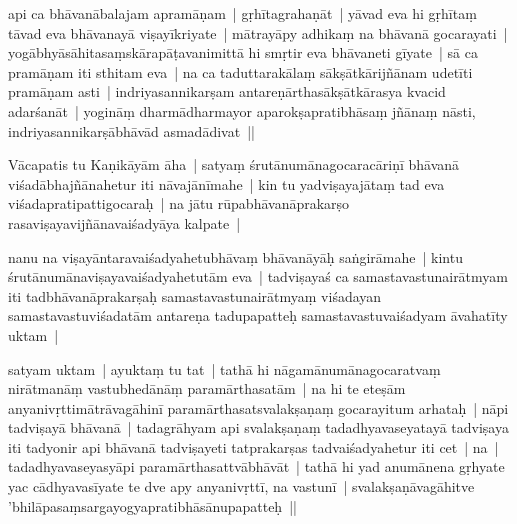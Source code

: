 \documentclass[article,12pt,a4paper]{memoir}%
\newcounter{parCount}
\begin{document}
	  
	  

	  
	  \pstart \leavevmode%
	api ca bhāvanābalajam apramāṇam | gṛhītagrahaṇāt | yāvad eva hi gṛhītaṃ tāvad eva bhāvanayā viṣayīkriyate | mātrayāpy adhikaṃ na bhāvanā gocarayati | yogābhyāsāhitasaṃskārapāṭavanimittā hi smṛtir eva bhāvaneti gīyate | sā ca pramāṇam iti sthitam eva | na ca taduttarakālaṃ sākṣātkārijñānam udetīti pramāṇam asti | indriyasannikarṣam antareṇārthasākṣātkārasya kvacid adarśanāt | yogināṃ dharmādharmayor aparokṣapratibhāsaṃ jñānaṃ nāsti, indriyasannikarṣābhāvād asmadādivat || 
	{}
	\pend%
      

	  
	  \pstart \leavevmode%
	\label{thakur75-10.14}Vācapatis tu Kaṇikāyām āha | satyaṃ śrutānumānagocaracāriṇī bhāvanā viśadābhajñānahetur iti nāvajānīmahe | kin tu yadviṣayajātaṃ tad eva viśadapratipattigocaraḥ | na jātu rūpabhāvanāprakarṣo rasaviṣayavijñānavaiśadyāya kalpate | 
	{}
	\pend%
      

	  
	  \pstart \leavevmode%
	\label{thakur75-10.17}nanu na viṣayāntaravaiśadyahetubhāvaṃ bhāvanāyāḥ saṅgirāmahe | kintu śrutānumānaviṣayavaiśadyahetutām eva | tadviṣayaś ca samastavastunairātmyam iti tadbhāvanāprakarṣaḥ samastavastunairātmyaṃ viśadayan samastavastuviśadatām antareṇa tadupapatteḥ samastavastuvaiśadyam āvahatīty uktam | 
	{}
	\pend%
      

	  
	  \pstart \leavevmode%
	\label{thakur75-10.21}satyam uktam | ayuktaṃ tu tat | tathā hi nāgamānumānagocaratvaṃ nirātmanāṃ vastubhedānāṃ paramārthasatām | na hi te eteṣām anyanivṛttimātrāvagāhinī paramārthasatsvalakṣaṇaṃ gocarayitum arhataḥ | nāpi tadviṣayā bhāvanā | tadagrāhyam api svalakṣaṇaṃ tadadhyavaseyatayā tadviṣaya iti tadyonir api bhāvanā tadviṣayeti tatprakarṣas tadvaiśadyahetur iti cet | na | tadadhyavaseyasyāpi paramārthasattvābhāvāt | tathā hi yad anumānena gṛhyate yac cādhyavasīyate te dve apy anyanivṛttī, na vastunī | svalakṣaṇāvagāhitve 'bhilāpasaṃsargayogyapratibhāsānupapatteḥ ||
	{}
	\pend%
      
\end{document}
